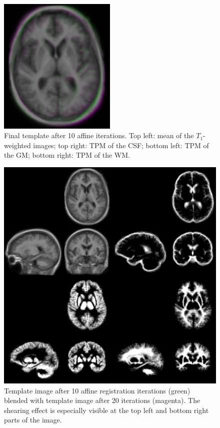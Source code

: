 \begin{figure}
  \includegraphics[width=0.5\textwidth]{figures/template_sheared}
  \centering
  \caption{Final template after 10 affine iterations. Top left: mean of the $T_1$-weighted images; top right: TPM of the CSF; bottom left: TPM of the GM; bottom right: TPM of the WM.}
  \label{fig:template-sheared}
\end{figure}


\begin{figure}
  \centering
  \includegraphics[width=\textwidth]{figures/affine_template_iter_9_collage}
  \centering
  \caption{Template image after 10 affine registration iterations (green) blended with template image after 20 iterations (magenta). The shearing effect is especially visible at the top left and bottom right parts of the image.}
  \label{fig:template-final}
\end{figure}


